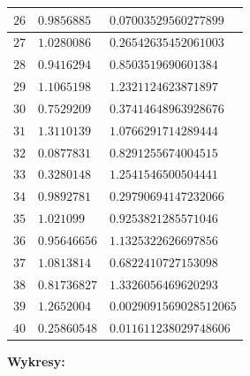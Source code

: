 \documentclass{article}
\begin{document}
\begin{center}
\begin{tabular}{|p{}|p{5cm}|p{5cm}|}
		\hline
		$26$ & $0.9856885$ & $0.07003529560277899$ \\ 
		\hline
		$27$ & $1.0280086$ & $0.26542635452061003$ \\ 
		\hline
		$28$ & $0.9416294$ & $0.8503519690601384$ \\ 
		\hline
		$29$ & $1.1065198$ & $1.2321124623871897$ \\ 
		\hline
		$30$ & $0.7529209$ & $0.37414648963928676$ \\ 
		\hline
		$31$ & $1.3110139$ & $1.0766291714289444$ \\ 
		\hline
		$32$ & $0.0877831$ & $0.8291255674004515$ \\ 
		\hline
		$33$ & $0.3280148$ & $1.2541546500504441$ \\ 
		\hline
		$34$ & $0.9892781$ & $0.29790694147232066$ \\ 
		\hline
		$35$ & $1.021099$ & $0.9253821285571046$ \\ 
		\hline
		$36$ & $0.95646656$ & $1.1325322626697856$ \\ 
		\hline
		$37$ & $1.0813814$ & $0.6822410727153098$ \\ 
		\hline
		$38$ & $0.81736827$ & $1.3326056469620293$ \\ 
		\hline
		$39$ & $1.2652004$ & $0.0029091569028512065$ \\ 
		\hline
		$40$ & $0.25860548$ & $0.011611238029748606$ \\ 
		\hline
	\end{tabular}
\end{center}
\newpage
\noindent \textbf{Wykresy:} \\\\
\end{document}
